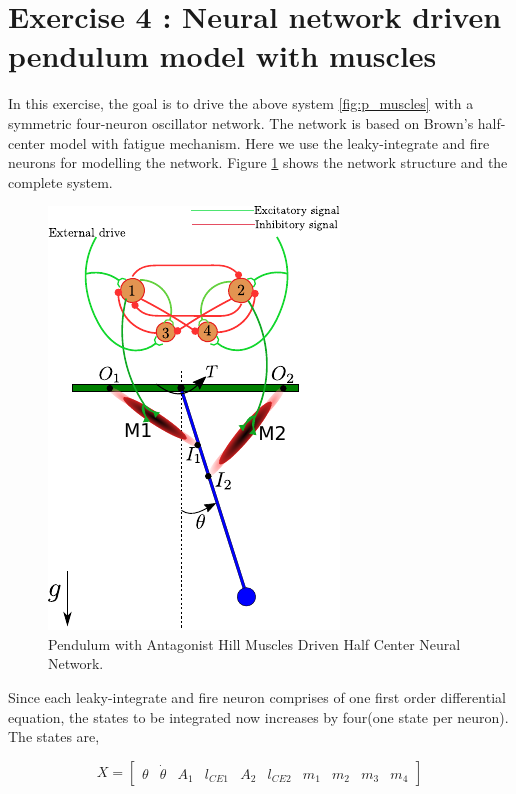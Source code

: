 \documentclass{cmc}
\begin{document}
\newpage
\section*{Exercise 4 : Neural network driven pendulum model with
  muscles}
\label{sec:neur-netw-driv}

In this exercise, the goal is to drive the above system
\ref{fig:p_muscles} with a symmetric four-neuron oscillator
network. The network is based on Brown's half-center model with
fatigue mechanism. Here we use the leaky-integrate and fire neurons
for modelling the network. Figure \ref{fig:p_muscles_neurons} shows
the network structure and the complete system.

\begin{figure}[H]
  \centering
  \includegraphics[scale=1.5]{figures/pendulum_muscles_neurons.pdf}
  \caption{Pendulum with Antagonist Hill Muscles Driven Half Center
    Neural Network.}
  \label{fig:p_muscles_neurons}
\end{figure}

Since each leaky-integrate and fire neuron comprises of one first
order differential equation, the states to be integrated now increases
by four(one state per neuron). The states are,


\begin{equation}
  \label{eq:1}
  X = \begin{bmatrix}
    \theta & \dot{\theta} & A_1 & l_{CE1} & A_2 & l_{CE2} & m_1 & m_2 & m_3 & m_4
  \end{bmatrix}
\end{equation}
\end{document}
